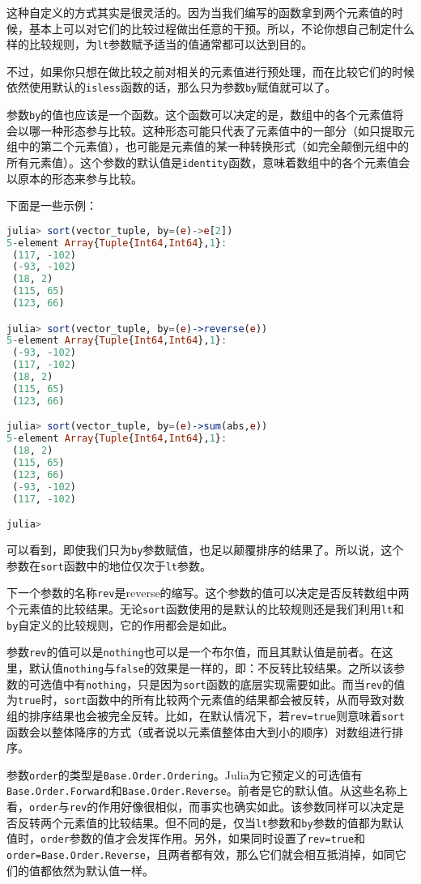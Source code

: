 这种自定义的方式其实是很灵活的。因为当我们编写的函数拿到两个元素值的时候，基本上可以对它们的比较过程做出任意的干预。所以，不论你想自己制定什么样的比较规则，为\verb|lt|参数赋予适当的值通常都可以达到目的。

不过，如果你只想在做比较之前对相关的元素值进行预处理，而在比较它们的时候依然使用默认的\verb|isless|函数的话，那么只为参数\verb|by|赋值就可以了。

参数\verb|by|的值也应该是一个函数。这个函数可以决定的是，数组中的各个元素值将会以哪一种形态参与比较。这种形态可能只代表了元素值中的一部分（如只提取元组中的第二个元素值），也可能是元素值的某一种转换形式（如完全颠倒元组中的所有元素值）。这个参数的默认值是\verb|identity|函数，意味着数组中的各个元素值会以原本的形态来参与比较。

下面是一些示例：

\begin{lstlisting}[language=julia]
julia> sort(vector_tuple, by=(e)->e[2])
5-element Array{Tuple{Int64,Int64},1}:
 (117, -102)
 (-93, -102)
 (18, 2)    
 (115, 65)  
 (123, 66)  

julia> sort(vector_tuple, by=(e)->reverse(e))
5-element Array{Tuple{Int64,Int64},1}:
 (-93, -102)
 (117, -102)
 (18, 2)    
 (115, 65)  
 (123, 66)  

julia> sort(vector_tuple, by=(e)->sum(abs,e))
5-element Array{Tuple{Int64,Int64},1}:
 (18, 2)    
 (115, 65)  
 (123, 66)  
 (-93, -102)
 (117, -102)

julia> 
\end{lstlisting}

可以看到，即使我们只为\verb|by|参数赋值，也足以颠覆排序的结果了。所以说，这个参数在\verb|sort|函数中的地位仅次于\verb|lt|参数。

下一个参数的名称\verb|rev|是reverse的缩写。这个参数的值可以决定是否反转数组中两个元素值的比较结果。无论\verb|sort|函数使用的是默认的比较规则还是我们利用\verb|lt|和\verb|by|自定义的比较规则，它的作用都会是如此。

参数\verb|rev|的值可以是\verb|nothing|也可以是一个布尔值，而且其默认值是前者。在这里，默认值\verb|nothing|与\verb|false|的效果是一样的，即：不反转比较结果。之所以该参数的可选值中有\verb|nothing|，只是因为\verb|sort|函数的底层实现需要如此。而当\verb|rev|的值为\verb|true|时，\verb|sort|函数中的所有比较两个元素值的结果都会被反转，从而导致对数组的排序结果也会被完全反转。比如，在默认情况下，若\verb|rev=true|则意味着\verb|sort|函数会以整体降序的方式（或者说以元素值整体由大到小的顺序）对数组进行排序。

参数\verb|order|的类型是\verb|Base.Order.Ordering|。Julia为它预定义的可选值有\verb|Base.Order.Forward|和\verb|Base.Order.Reverse|。前者是它的默认值。从这些名称上看，\verb|order|与\verb|rev|的作用好像很相似，而事实也确实如此。该参数同样可以决定是否反转两个元素值的比较结果。但不同的是，仅当\verb|lt|参数和\verb|by|参数的值都为默认值时，\verb|order|参数的值才会发挥作用。另外，如果同时设置了\verb|rev=true|和\verb|order=Base.Order.Reverse|，且两者都有效，那么它们就会相互抵消掉，如同它们的值都依然为默认值一样。

